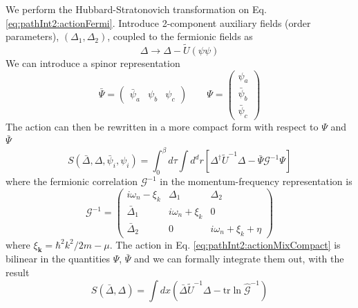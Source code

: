 \documentclass[reprint,pra]{revtex4-1}
\newcommand{\vk}{\ensuremath{\mathbf{k}}}
\newcommand{\nth}[1]{\ensuremath{\frac{1}{#1}}}
\newcommand{\br}[1]{\ensuremath{\left(#1\right)}}
\newcommand{\mbr}[1]{\ensuremath{\left[#1\right]}}
\newcommand{\mtrx}[1]{\ensuremath{\begin{pmatrix}#1\end{pmatrix}}}
\newcommand{\dg}{\ensuremath{\dagger}}
\newcommand{\tr}{\ensuremath{\text{tr}}}
\newcommand{\nG}{\ensuremath{\hat{\mathcal{G}}^{-1}}}
\begin{document}
We  perform the Hubbard-Stratonovich transformation on Eq.\ref{eq:pathInt2:actionFermi}.   Introduce 2-component  auxiliary fields (order parameters), $(\Delta_{1},\Delta_{2})$, coupled to the fermionic fields as 
\begin{equation}\label{eq:pathInt2:DeltaPhi}
\Delta\longrightarrow\Delta-\tilde{U}(\psi\psi)
\end{equation}
We can introduce  a spinor representation   
\begin{equation}
\bar\Psi=\mtrx{\bar\psi_{a}&\psi_{b}&\psi_{c}}\qquad\Psi=\mtrx{\psi_{a}\\\bar\psi_{b}\\\bar\psi_{c}}
\end{equation}
The action can then be rewritten in a more compact form with respect to $\Psi$ and $\bar\Psi$
\begin{equation}\label{eq:pathInt2:actionMixCompact}
S(\bar\Delta,\Delta,\bar\psi_{i},\psi_{i})=\int^{\beta}_{0}d\tau\int{d^{d}r}
	\mbr{\Delta^{\dg}\tilde{U}^{-1}\Delta-\bar\Psi\mathcal{G}^{-1}\Psi}
\end{equation}
where the fermionic correlation $\mathcal{G}^{-1}$ in the momentum-frequency representation is 
\begin{equation}\label{eq:nG}
\mathcal{G}^{-1}=
\begin{pmatrix}
i\omega_{n}-\xi_{k}&\Delta_{1}&\Delta_{2}\\
\bar\Delta_{1}&i\omega_{n}+\xi_{k}&0\\
\bar\Delta_{2}&0&i\omega_{n}+\xi_{k}+\eta
\end{pmatrix}
\end{equation}
where $\xi_{\vk}=\hbar^{2}k^{2}/2m-\mu$. 
The action in Eq. \ref{eq:pathInt2:actionMixCompact} is  bilinear in the quantities $\Psi$, $\bar\Psi$ and we can formally integrate them out, with the result 
\begin{equation}\label{eq:pathInt2:actionD}
S(\bar{\Delta},\Delta)=\int{dx}\br{\bar{\Delta}\tilde{U}^{-1}\Delta-\tr\ln\nG}
\end{equation}
\end{document}
